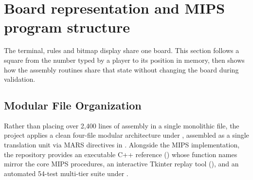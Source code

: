 \section{Board representation and MIPS program structure}
\label{sec:arch}

The terminal, rules and bitmap display share one board. This section follows a square from the number typed by a player to its position in memory, then shows how the assembly routines share that state without changing the board during validation.

\subsection{Modular File Organization}
Rather than placing over 2,400 lines of assembly in a single monolithic file, the project applies a clean four-file modular architecture under , assembled as a single translation unit via MARS  directives in . Alongside the MIPS implementation, the repository provides an executable C++ reference () whose function names mirror the core MIPS procedures, an interactive Tkinter replay tool (), and an automated 54-test multi-tier  suite under .

